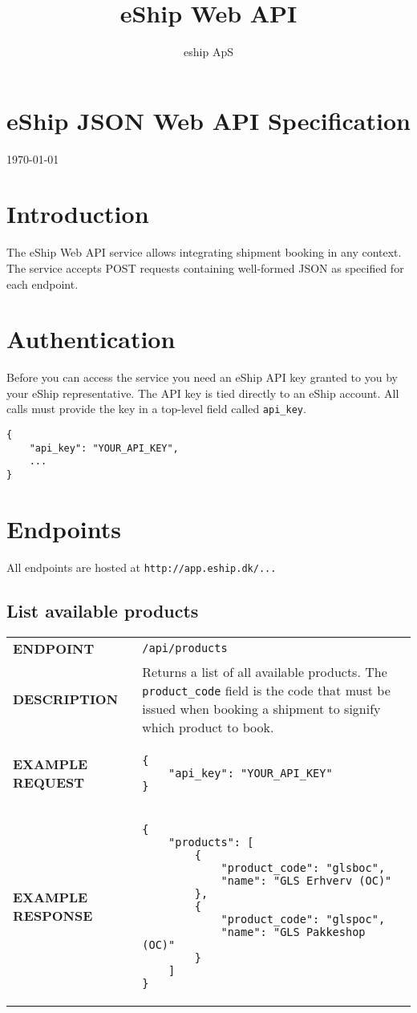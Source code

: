 \documentclass{article}
\author{eship ApS}
\title{eShip Web API}
\begin{document}
	
\section*{eShip JSON Web API Specification}
\today

\tableofcontents


\section{Introduction}
The eShip Web API service allows integrating shipment booking in any context. The service accepts POST requests containing well-formed JSON as specified for each endpoint.

\section{Authentication}
Before you can access the service you need an eShip API key granted to you by your eShip representative. The API key is tied directly to an eShip account. All calls must provide the key in a top-level field called \verb|api_key|.

\begin{lstlisting}
{
    "api_key": "YOUR_API_KEY",
    ...
}
\end{lstlisting}

\section{Endpoints}
All endpoints are hosted at \verb|http://app.eship.dk/...|

\subsection{List available products}
\begin{tabular}{l|p{10cm}}
	\textbf{ENDPOINT} & \verb|/api/products|\\
	\textbf{DESCRIPTION} & Returns a list of all available products. The \verb|product_code| field is the code that must be issued when booking a shipment to signify which product to book.\\
	\textbf{EXAMPLE REQUEST} & \begin{lstlisting}
{
	"api_key": "YOUR_API_KEY"
}
	\end{lstlisting}\\
	\textbf{EXAMPLE RESPONSE} & \begin{lstlisting}
{
    "products": [
        {
            "product_code": "glsboc",
            "name": "GLS Erhverv (OC)"
        },
        {
            "product_code": "glspoc",
            "name": "GLS Pakkeshop (OC)"
        }
    ]
}
	\end{lstlisting}\\
\end{tabular}
\end{document}
